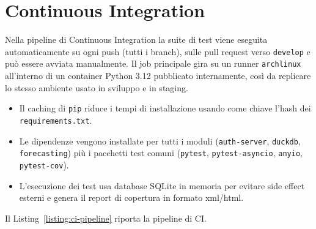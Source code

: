 \section{Continuous Integration}
Nella pipeline di Continuous Integration la suite di test viene eseguita automaticamente su ogni push (tutti i branch), sulle pull request verso \texttt{develop} e può essere avviata manualmente. Il job principale gira su un runner \texttt{archlinux} all’interno di un container Python 3.12 pubblicato internamente, così da replicare lo stesso ambiente usato in sviluppo e in staging.
\begin{itemize}
    \item Il caching di \texttt{pip} riduce i tempi di installazione usando come chiave l’hash dei \texttt{requirements.txt}.
    \item Le dipendenze vengono installate per tutti i moduli (\texttt{auth-server}, \texttt{duckdb}, \texttt{forecasting}) più i pacchetti test comuni (\texttt{pytest}, \texttt{pytest-asyncio}, \texttt{anyio}, \texttt{pytest-cov}).
    \item L’esecuzione dei test usa database SQLite in memoria per evitare side effect esterni e genera il report di copertura in formato \gls{xml}/\gls{html}.
\end{itemize}
Il Listing~\ref{listing:ci-pipeline} riporta la pipeline di CI.
\captionsetup{type=listing, belowskip=0pt}
\inputminted[fontsize=\small, breaklines, breakanywhere=true, linenos=true, bgcolor=gray!10]{yaml}{code/ci.yml}
\label{listing:ci-pipeline}

\newpage
